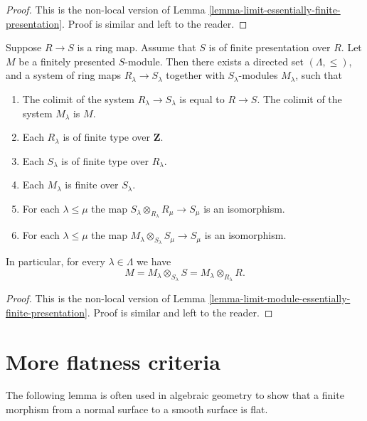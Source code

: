 \begin{proof}
This is the non-local version of
Lemma \ref{lemma-limit-essentially-finite-presentation}.
Proof is similar and left to the reader.
\end{proof}

\begin{lemma}
\label{lemma-limit-module-finite-presentation}
Suppose $R \to S$ is a ring map.
Assume that $S$ is of finite presentation over $R$.
Let $M$ be a finitely presented $S$-module.
Then there exists a directed set $(\Lambda, \leq)$, and
a system of ring maps $R_\lambda \to S_\lambda$
together with $S_\lambda$-modules $M_\lambda$,
such that
\begin{enumerate}
\item The colimit of the system $R_\lambda \to S_\lambda$
is equal to $R \to S$. The colimit of the system $M_\lambda$
is $M$.
\item Each $R_\lambda$ is of finite type
over $\mathbf{Z}$.
\item Each $S_\lambda$ is of finite type
over $R_\lambda$.
\item Each $M_\lambda$ is finite over $S_\lambda$.
\item For each $\lambda \leq \mu$ the map
$S_\lambda \otimes_{R_\lambda} R_\mu \to S_\mu$
is an isomorphism.
\item For each $\lambda \leq \mu$ the map
$M_\lambda \otimes_{S_\lambda} S_\mu \to S_\mu$
is an isomorphism.
\end{enumerate}
In particular, for every $\lambda \in \Lambda$ we have
$$
M = M_\lambda \otimes_{S_\lambda} S
= M_\lambda \otimes_{R_\lambda} R.
$$
\end{lemma}

\begin{proof}
This is the non-local version of
Lemma \ref{lemma-limit-module-essentially-finite-presentation}.
Proof is similar and left to the reader.
\end{proof}














\section{More flatness criteria}
\label{section-more-flatness-criteria}

\noindent
The following lemma is often used in algebraic geometry to show that a finite
morphism from a normal surface to a smooth surface is flat.

